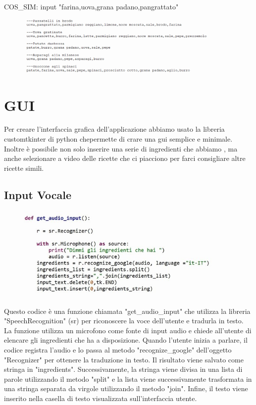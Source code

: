 \documentclass[12pt]{report}
\begin{document}
COS\_SIM: input "farina,uova,grana padano,pangrattato"

\begin{figure}[H]
        \centering
        {\includegraphics[width=0.9\textwidth]{img/img19.jpg}}
\end{figure}

\chapter{GUI}
Per creare l’interfaccia grafica dell’applicazione abbiamo usato la libreria customtkinter di python chepermette di crare una gui semplice e minimale. Inoltre è possibile non solo inserire una serie di ingredienti che abbiamo , ma anche selezionare a video delle ricette che ci piacciono per farci consigliare altre ricette simili. 
\section{Input Vocale}   
\begin{figure}[H]
        \centering
        {\includegraphics[width=0.9\textwidth]{img/img20.jpg}}
\end{figure}

Questo codice è una funzione chiamata "get\_audio\_input" che utilizza la libreria "SpeechRecognition" (sr) per riconoscere la voce dell'utente e tradurla in testo. La funzione utilizza un microfono come fonte di input audio e chiede all'utente di elencare gli ingredienti che ha a disposizione. Quando l'utente inizia a parlare, il codice registra l'audio e lo passa al metodo "recognize\_google" dell'oggetto "Recognizer" per ottenere la traduzione in testo. Il risultato viene salvato come stringa in "ingredients". Successivamente, la stringa viene divisa in una lista di parole utilizzando il metodo "split" e la lista viene successivamente trasformata in una stringa separata da virgole utilizzando il metodo "join". Infine, il testo viene inserito nella casella di testo visualizzata sull'interfaccia utente.
\end{document}
